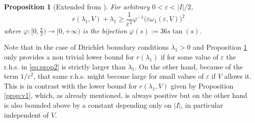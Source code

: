 \documentclass[12pt]{article}
\newtheorem{prop}{Proposition}
\newcommand{\eps}{\varepsilon}
\begin{document}
\begin{prop}[Extended from \cite{Wei21}]\label{prop:v2}  For arbitrary $0 < \eps < |I| / 2$,
\begin{equation}\label{eq:prop2}
r(\lambda_1, V) + \lambda_1 \geq \frac{1}{\eps^2} \varphi^{-1}\big(\eps
\omega_1(\eps, V)\big)^2
\end{equation}
where $\varphi:[0,\frac{\pi}{2}) \to [0,+\infty)$ is the bijection $\varphi(s) := 36 s
\tan(s)$.
\end{prop}

Note that in the case of Dirichlet boundary conditions $\lambda_1 > 0$ and 
Proposition \ref{prop:v2} only provides a non trivial lower bound for 
$r(\lambda_1)$ if for some value of $\eps$ the r.h.s. in \eqref{eq:prop2} is 
strictly larger than $\lambda_1.$ On the other hand, because of the term
$1/\eps^2$, that same r.h.s. might become large for small values of $\eps$ 
if $V$ allows it. 
This is in contrast with the lower bound for $r(\lambda_1,V)$ given by  
Proposition \ref{prop:v1}, which, as already mentioned, is always positive but on 
the other hand is also bounded above by a constant depending only on $|I|$, in particular 
independent of $V$. 
\end{document}
